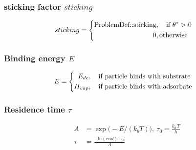 \subsubsection*{sticking factor $sticking$}
\begin{equation}
	\label{eq:sticking}
	sticking=
	\begin{cases}
		\begin{split}
		\text{ProblemDef::sticking}&, \text{\quad if}\ \theta^*>0\\
		0&,  \text{otherwise}
		\end{split}
	\end{cases}
\end{equation}

\subsubsection*{Binding energy $E$}
\begin{equation}
	\label{eq:energy}
	E=
	\begin{cases}
		\begin{split}
		E_{de}&, \text{\quad if particle binds with substrate}\\
		H_{vap}&,  \text{\quad if particle binds with adsorbate}
		\end{split}
	\end{cases}
\end{equation}


\subsubsection*{Residence time $\tau$}
\begin{equation}
	\label{eq:sojourntime}
	\begin{split}
		A&=\exp\big( - E/(k_b T)\big),\ \tau_0 = \frac{k_b \, T}{h}\\
		\tau &= \frac{-\text{ln}(rnd) \cdot \tau_0}{A}
	\end{split}
\end{equation}
%
